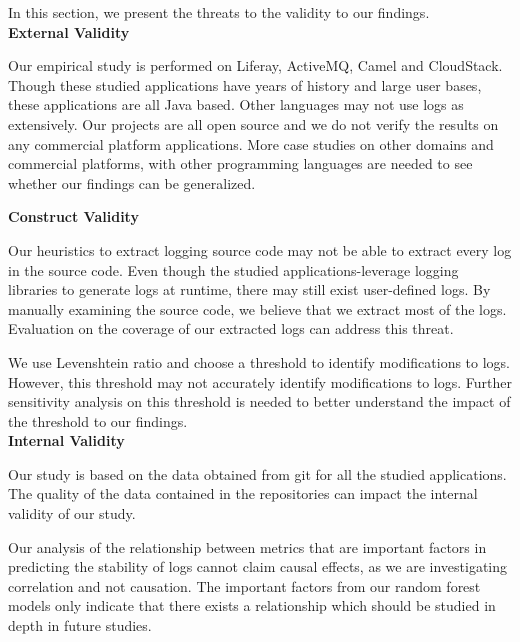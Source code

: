 In this section, we present the threats to the validity to our findings. \\


\noindent \textbf{External Validity}

Our empirical study is performed on Liferay, ActiveMQ, Camel and CloudStack. Though these studied applications have years of history and large user bases, these applications are all Java based. Other languages
 may not use logs as extensively. Our projects are all open source and we do not verify the results on any commercial platform applications. More case studies on other domains and commercial platforms, with other programming languages are needed to see whether our findings can be generalized. 



\noindent \textbf{Construct Validity}


Our heuristics to extract logging source code may not be able to extract every log in the source code. Even though the studied applications-leverage logging libraries to generate logs at runtime, there may still exist user-defined logs. By manually examining the source code, we believe that we extract most of the logs. Evaluation on the coverage of our extracted logs can address this threat.



We use Levenshtein ratio and choose a threshold to identify modifications to logs. However, this threshold may not accurately identify modifications to logs. Further sensitivity analysis on this threshold is needed to better understand the impact of the threshold to our findings. \\


\noindent \textbf{Internal Validity}

Our study is based on the data obtained from git for all the studied applications. The quality of the data contained in the repositories can impact the internal validity of our study.

Our analysis of the relationship between metrics that are important factors in predicting the stability of logs cannot claim causal effects, as we are investigating correlation and not causation. The important factors from our random forest models only indicate that there exists a relationship which should be studied in depth in future studies. 



